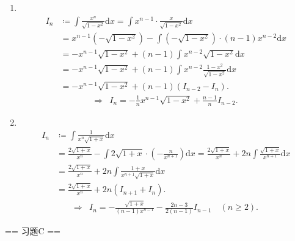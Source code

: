 \begin{solution}
\begin{enumerate}
    \item[7.]\\
    \[
    \begin{aligned}
    I_{n}&\coloneqq\int\frac{x^n}{\sqrt{1-x^2}}\mathrm{d}x=\int x^{n-1}\cdot\frac{x}{\sqrt{1-x^2}}\mathrm{d}x\\
    &=x^{n-1}\left(-\sqrt{1-x^2}\right)-\int\left(-\sqrt{1-x^2}\right)\cdot(n-1)x^{n-2}\mathrm{d}x\\
    &=-x^{n-1}\sqrt{1-x^2}+(n-1)\int x^{n-2}\sqrt{1-x^2}\mathrm{d}x\\
    &=-x^{n-1}\sqrt{1-x^2}+(n-1)\int x^{n-2}\frac{1-x^2}{\sqrt{1-x^2}}\mathrm{d}x\\
    &=-x^{n-1}\sqrt{1-x^2}+(n-1)(I_{n-2}-I_{n}).
    \end{aligned}
    \]
    \[
    \begin{aligned}
    \Rightarrow&I_{n}=-\frac{1}{n}x^{n-1}\sqrt{1-x^2}+\frac{n-1}{n}I_{n-2}.
    \end{aligned}
    \]

    \item[8.]\\
    \[
    \begin{aligned}
    I_{n}&\coloneqq \int\frac{1}{x^{n}\sqrt{1+x}}\mathrm{d}x\\
    &=\frac{2\sqrt{1+x}}{x^{n}}-\int 2\sqrt{1+x}\cdot\left(-\frac{n}{x^{n+1}}\right)\mathrm{d}x=\frac{2\sqrt{1+x}}{x^{n}}+2n\int\frac{\sqrt{1+x}}{x^{n+1}}\mathrm{d}x\\
    &=\frac{2\sqrt{1+x}}{x^{n}}+2n\int\frac{1+x}{x^{n+1}\sqrt{1+x}}\mathrm{d}x\\
    &=\frac{2\sqrt{1+x}}{x^{n}}+2n(I_{n+1}+I_{n}).
    \end{aligned}
    \]
    \[
    \begin{aligned}
    \Rightarrow&I_{n}=-\frac{\sqrt{1+x}}{(n-1)x^{n-1}}-\frac{2n-3}{2(n-1)}I_{n-1}\quad (n\geq 2).
    \end{aligned}
    \]
    \end{enumerate}
\end{solution}

== 习题C ==

